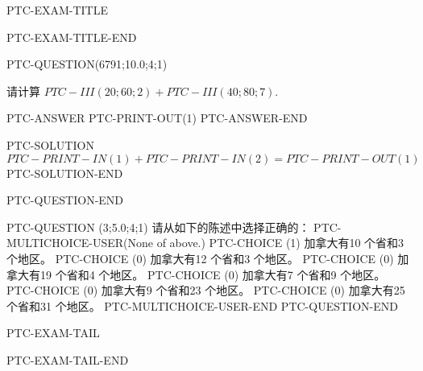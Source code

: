 \documentclass{ctexart}
\begin{document}
PTC-EXAM-TITLE




PTC-EXAM-TITLE-END



PTC-QUESTION(6791;10.0;4;1)

请计算 $PTC-III (20; 60; 2) + PTC-III (40; 80; 7) $. 

PTC-ANSWER
   PTC-PRINT-OUT(1)
PTC-ANSWER-END

PTC-SOLUTION
$PTC-PRINT-IN(1) + PTC-PRINT-IN(2)=  PTC-PRINT-OUT(1)$
PTC-SOLUTION-END

PTC-QUESTION-END



PTC-QUESTION  (3;5.0;4;1)
请从如下的陈述中选择正确的：
PTC-MULTICHOICE-USER(None of above.)
   PTC-CHOICE (1) 加拿大有10 个省和3 个地区。
   PTC-CHOICE (0) 加拿大有12 个省和3 个地区。
   PTC-CHOICE (0) 加拿大有19 个省和4 个地区。
   PTC-CHOICE (0) 加拿大有7 个省和9 个地区。
   PTC-CHOICE (0) 加拿大有9 个省和23 个地区。
   PTC-CHOICE (0) 加拿大有25 个省和31 个地区。
PTC-MULTICHOICE-USER-END
PTC-QUESTION-END



PTC-EXAM-TAIL

PTC-EXAM-TAIL-END
\end{document}
